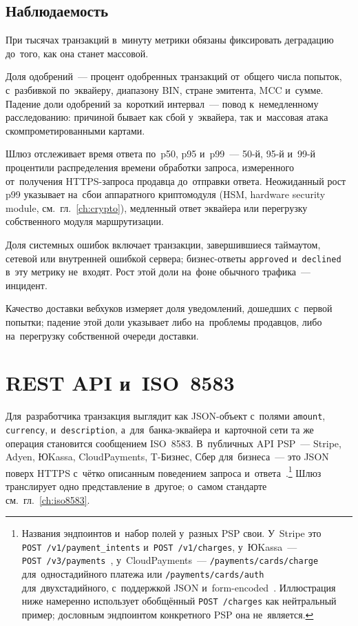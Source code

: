 
\subsection*{Наблюдаемость}

При тысячах транзакций в~минуту метрики обязаны фиксировать деградацию до~того,
как она станет массовой.

Доля одобрений~--- процент одобренных транзакций от~общего числа попыток,
с~разбивкой по~эквайеру, диапазону BIN, стране эмитента, MCC и~сумме. Падение
доли одобрений за~короткий интервал~--- повод к~немедленному расследованию:
причиной бывает как сбой у~эквайера, так и~массовая атака скомпрометированными
картами.

Шлюз отслеживает время ответа по~p50, p95 и~p99~--- 50-й, 95-й и~99-й
процентили распределения времени обработки запроса, измеренного от~получения
HTTPS-запроса продавца до~отправки ответа. Неожиданный рост p99 указывает
на~сбои аппаратного криптомодуля (HSM, hardware security module,
см.~гл.~\ref{ch:crypto}), медленный ответ эквайера или перегрузку
собственного модуля маршрутизации.

Доля системных ошибок включает транзакции, завершившиеся таймаутом, сетевой или
внутренней ошибкой сервера; бизнес-ответы \texttt{approved} и~\texttt{declined}
в~эту метрику не~входят. Рост этой доли на~фоне обычного трафика~--- инцидент.

Качество доставки вебхуков измеряет доля уведомлений, дошедших с~первой
попытки; падение этой доли указывает либо на~проблемы продавцов, либо
на~перегрузку собственной очереди доставки.

\section{REST API и~ISO~8583}\label{sec:gw-api-to-iso}

Для~разработчика транзакция выглядит как JSON-объект с~полями
\texttt{amount}, \texttt{currency}, \mbox{}
и~\texttt{description}, а~для~банка-эквайера и~карточной сети та же операция
становится сообщением ISO~8583. В~публичных API PSP~--- Stripe, Adyen, ЮKassa,
CloudPayments, T-Бизнес, Сбер для~бизнеса~--- это JSON поверх HTTPS с~чётко
описанным поведением запроса
и~ответа~\cite{stripe-api-reference}.\footnote{Названия
  эндпоинтов и~набор полей у~разных PSP свои. У~Stripe это
  \texttt{POST~/v1/payment\_intents} и~\texttt{POST~/v1/charges}, у~ЮKassa~---
  \texttt{POST~/v3/payments}~\cite{yookassa-api}, у~CloudPayments~--- \texttt{/payments/cards/charge}
  для~одностадийного платежа или \texttt{/payments/cards/auth}
  для~двухстадийного, с~поддержкой JSON и~form-encoded~\cite{cloudpayments-api}. Иллюстрация ниже
  намеренно использует обобщённый \texttt{POST~/charges} как нейтральный пример;
дословным эндпоинтом конкретного PSP она не~является.} Шлюз транслирует одно
представление в~другое; о~самом стандарте см.~гл.~\ref{ch:iso8583}.

